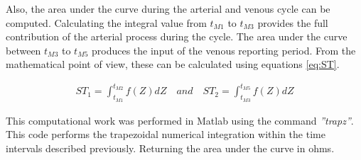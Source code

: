
Also, the area under the curve during the arterial and venous cycle can be computed. Calculating the integral value from $t_{M1}$ to $t_{M3}$ provides the full contribution of the arterial process during the cycle. The area under the curve between $t_{M3}$ to $t_{M5}$ produces the input of the venous reporting period. From the mathematical point of view, these can be calculated using equations \ref{eq:ST}.

\begin{align}
	\label{eq:ST}
	ST_1 = \int_{t_{M1}}^{t_{M2}} f(Z) dZ \quad and \quad ST_2 = \int_{t_{M3}}^{t_{M5}} f(Z) dZ 
\end{align}

This computational work was performed in Matlab using the command \textit{''trapz''}. This code performs the trapezoidal numerical integration within the time intervals described previously. Returning the area under the curve in ohms.



\nomenclature[g-p]{$\pi$}{ $\simeq 3.14\ldots$}  
